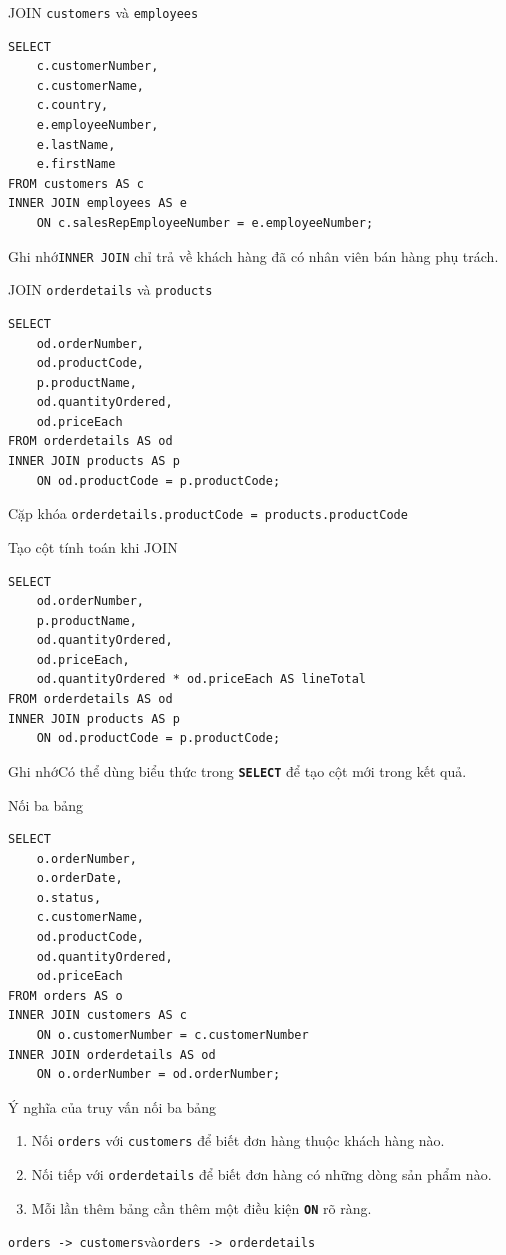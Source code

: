 \documentclass[aspectratio=169,11pt]{beamer}
\newcommand{\tbl}[1]{\texttt{#1}}
\newcommand{\kw}[1]{\textbf{\texttt{#1}}}
\newcommand{\hint}[1]{\begin{block}{Ghi nhớ}#1\end{block}}
\begin{document}
\begin{frame}[fragile]{JOIN \texttt{customers} và \texttt{employees}}
\begin{lstlisting}
SELECT
    c.customerNumber,
    c.customerName,
    c.country,
    e.employeeNumber,
    e.lastName,
    e.firstName
FROM customers AS c
INNER JOIN employees AS e
    ON c.salesRepEmployeeNumber = e.employeeNumber;
\end{lstlisting}
\hint{\texttt{INNER JOIN} chỉ trả về khách hàng đã có nhân viên bán hàng phụ trách.}
\end{frame}

\begin{frame}[fragile]{JOIN \texttt{orderdetails} và \texttt{products}}
\begin{lstlisting}
SELECT
    od.orderNumber,
    od.productCode,
    p.productName,
    od.quantityOrdered,
    od.priceEach
FROM orderdetails AS od
INNER JOIN products AS p
    ON od.productCode = p.productCode;
\end{lstlisting}
\begin{block}{Cặp khóa}
\centering \texttt{orderdetails.productCode = products.productCode}
\end{block}
\end{frame}

\begin{frame}[fragile]{Tạo cột tính toán khi JOIN}
\begin{lstlisting}
SELECT
    od.orderNumber,
    p.productName,
    od.quantityOrdered,
    od.priceEach,
    od.quantityOrdered * od.priceEach AS lineTotal
FROM orderdetails AS od
INNER JOIN products AS p
    ON od.productCode = p.productCode;
\end{lstlisting}
\hint{Có thể dùng biểu thức trong \kw{SELECT} để tạo cột mới trong kết quả.}
\end{frame}

\begin{frame}[fragile]{Nối ba bảng}
\begin{lstlisting}
SELECT
    o.orderNumber,
    o.orderDate,
    o.status,
    c.customerName,
    od.productCode,
    od.quantityOrdered,
    od.priceEach
FROM orders AS o
INNER JOIN customers AS c
    ON o.customerNumber = c.customerNumber
INNER JOIN orderdetails AS od
    ON o.orderNumber = od.orderNumber;
\end{lstlisting}
\end{frame}

\begin{frame}{Ý nghĩa của truy vấn nối ba bảng}
\begin{enumerate}
  \item Nối \tbl{orders} với \tbl{customers} để biết đơn hàng thuộc khách hàng nào.
  \item Nối tiếp với \tbl{orderdetails} để biết đơn hàng có những dòng sản phẩm nào.
  \item Mỗi lần thêm bảng cần thêm một điều kiện \kw{ON} rõ ràng.
\end{enumerate}
\vspace{0.5em}
\centering
\texttt{orders -> customers}\quad và\quad \texttt{orders -> orderdetails}
\end{frame}
\end{document}
